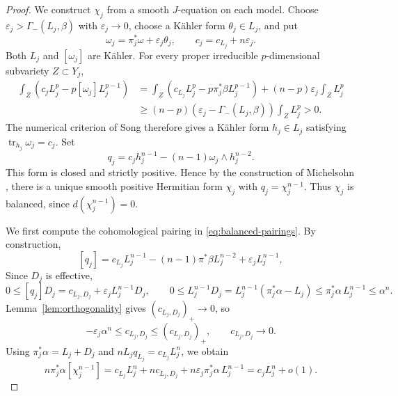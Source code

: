 \documentclass[reqno]{amsart}
\numberwithin{equation}{section}
\theoremstyle{definition}
\DeclareMathOperator{\tr}{tr}
\begin{document}
\begin{proof}
We construct $\chi_j$ from a smooth $J$-equation on each model.
Choose $\varepsilon_j>\Gamma_-(L_j,\beta)$ with $\varepsilon_j\to0$, choose
a K\"ahler form $\theta_j\in L_j$, and put
\[
\omega_j=\pi_j^*\omega+\varepsilon_j\theta_j,\qquad
c_j=c_{L_j}+n\varepsilon_j.
\]
Both $L_j$ and $[\omega_j]$ are K\"ahler. For every proper
irreducible $p$-dimensional subvariety $Z\subset Y_j$,
\[
\begin{aligned}
\int_Z(c_jL_j^p-p[\omega_j]L_j^{p-1})
&=\int_Z(c_{L_j}L_j^p-p\pi_j^*\beta L_j^{p-1})
  +(n-p)\varepsilon_j\int_ZL_j^p\\
&\ge(n-p)(\varepsilon_j-\Gamma_-(L_j,\beta))\int_ZL_j^p>0.
\end{aligned}
\]
The numerical criterion of Song \cite{S20} therefore gives a K\"ahler form
$h_j\in L_j$ satisfying $\tr_{h_j}\omega_j=c_j$.
Set
\begin{equation}\label{eq:balanced-form}
q_j=c_jh_j^{n-1}-(n-1)\omega_j\wedge h_j^{n-2}.
\end{equation}
This form is closed and strictly positive. Hence by the construction of Michelsohn
\cite[pp.~279--280]{M82} , there is a unique smooth positive
Hermitian form $\chi_j$ with $q_j=\chi_j^{n-1}$.
Thus $\chi_j$ is balanced, since $d(\chi_j^{n-1})=0$.

We first compute the cohomological pairing in
\eqref{eq:balanced-pairings}. By construction,
\begin{equation}\label{eq:balanced-class}
[q_j]=c_{L_j}L_j^{n-1}-(n-1)\pi^*\beta L_j^{n-2}+\varepsilon_jL_j^{n-1}, 
\end{equation}
Since $D_j$ is effective,
\[
0\le[q_j]D_j=c_{L_j,D_j}+\varepsilon_jL_j^{n-1}D_j,
\qquad
0\le L_j^{n-1}D_j=L_j^{n-1}(\pi_j^*\alpha-L_j)\le\pi_j^*\alpha\,L_j^{n-1}\le\alpha^n.
\]
Lemma~\ref{lem:orthogonality} gives
$(c_{L_j,D_j})_+\to0$, so
\begin{equation}\label{eq:divisor-limit}
-\varepsilon_j\alpha^n\le c_{L_j,D_j}\le(c_{L_j,D_j})_+,
\qquad c_{L_j,D_j}\longrightarrow0.
\end{equation}
Using $\pi_j^*\alpha=L_j+D_j$ and $nL_jq_{L_j}=c_{L_j}L_j^n$, we obtain
\[
n\pi_j^*\alpha[\chi_j^{n-1}]
=c_{L_j}L_j^n+nc_{L_j,D_j}
 +n\varepsilon_j\pi_j^*\alpha\,L_j^{n-1}
=c_jL_j^n+o(1).
\]


\end{proof}
\end{document}
